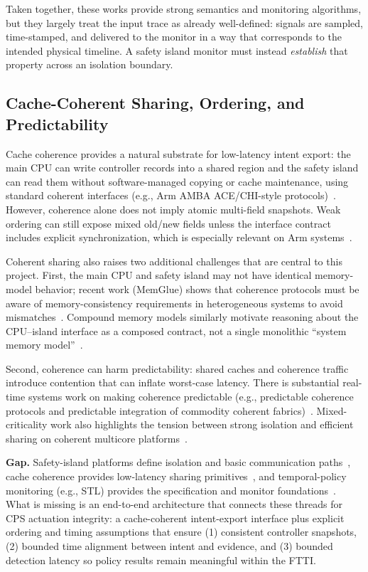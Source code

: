 \documentclass[letterpaper,twocolumn,10pt]{article}
\newcommand{\SafetyIsland}{safety island\xspace}
\newcommand{\STL}{STL\xspace}
\newcommand{\FTTI}{FTTI\xspace}
\newcommand{\PrimaryCompute}{main CPU\xspace}
\begin{document}
Taken together, these works provide strong semantics and monitoring algorithms, but they largely treat the input trace as already well-defined: signals are sampled, time-stamped, and delivered to the monitor in a way that corresponds to the intended physical timeline. A \SafetyIsland monitor must instead \emph{establish} that property across an isolation boundary.

\subsection{Cache-Coherent Sharing, Ordering, and Predictability}
Cache coherence provides a natural substrate for low-latency intent export: the \PrimaryCompute can write controller records into a shared region and the \SafetyIsland can read them without software-managed copying or cache maintenance, using standard coherent interfaces (e.g., Arm AMBA ACE/CHI-style protocols)~\cite{ArmAMBA4,ArmAMBA5}. However, coherence alone does not imply atomic multi-field snapshots. Weak ordering can still expose mixed old/new fields unless the interface contract includes explicit synchronization, which is especially relevant on Arm systems~\cite{Pulte2018SimplifyingARM}.

Coherent sharing also raises two additional challenges that are central to this project. First, the \PrimaryCompute and \SafetyIsland may not have identical memory-model behavior; recent work (MemGlue) shows that coherence protocols must be aware of memory-consistency requirements in heterogeneous systems to avoid mismatches~\cite{CleavelandTrippel2024MemGlue}. Compound memory models similarly motivate reasoning about the CPU--island interface as a composed contract, not a single monolithic ``system memory model''~\cite{Goens2023CompoundConsistency}.

Second, coherence can harm predictability: shared caches and coherence traffic introduce contention that can inflate worst-case latency. There is substantial real-time systems work on making coherence predictable (e.g., predictable coherence protocols and predictable integration of commodity coherent fabrics)~\cite{Hassan2017PredictableCoherence,Kaushik2021PredictableCoherence,Hassan2022IntegratingCOTSCoherence}. Mixed-criticality work also highlights the tension between strong isolation and efficient sharing on coherent multicore platforms~\cite{Chisholm2016TensionIsolationSharing}.

\textbf{Gap.} Safety-island platforms define isolation and basic communication paths~\cite{ArmHIPC,NVIDIADriveFSI}, cache coherence provides low-latency sharing primitives~\cite{ArmAMBA4,ArmAMBA5}, and temporal-policy monitoring (e.g., \STL) provides the specification and monitor foundations~\cite{Deshmukh2017,RTAMT2020}. What is missing is an end-to-end architecture that connects these threads for CPS actuation integrity: a cache-coherent intent-export interface plus explicit ordering and timing assumptions that ensure (1) consistent controller snapshots, (2) bounded time alignment between intent and evidence, and (3) bounded detection latency so policy results remain meaningful within the \FTTI.
\end{document}
